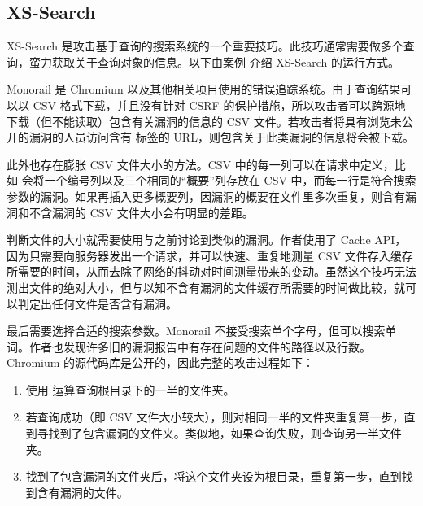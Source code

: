 \subsection{XS-Search}\label{sec:search}

XS-Search 是攻击基于查询的搜索系统的一个重要技巧。此技巧通常需要做多个查询，蛮力获取关于查询对象的信息。以下由案例 \cite{xssearch} 介绍 XS-Search 的运行方式。

Monorail 是 Chromium 以及其他相关项目使用的错误追踪系统。由于查询结果可以以 CSV 格式下载，并且没有针对 CSRF 的保护措施，所以攻击者可以跨源地下载（但不能读取）包含有关漏洞的信息的 CSV 文件。若攻击者将具有浏览未公开的漏洞的人员访问含有  标签的 URL，则包含关于此类漏洞的信息将会被下载。

此外也存在膨胀 CSV 文件大小的方法。CSV 中的每一列可以在请求中定义，比如  会将一个编号列以及三个相同的“概要”列存放在 CSV 中，而每一行是符合搜索参数的漏洞。如果再插入更多概要列，因漏洞的概要在文件里多次重复，则含有漏洞和不含漏洞的 CSV 文件大小会有明显的差距。

判断文件的大小就需要使用与之前讨论到类似的漏洞。作者使用了 Cache API，因为只需要向服务器发出一个请求，并可以快速、重复地测量 CSV 文件存入缓存所需要的时间，从而去除了网络的抖动对时间测量带来的变动。虽然这个技巧无法测出文件的绝对大小，但与以知不含有漏洞的文件缓存所需要的时间做比较，就可以判定出任何文件是否含有漏洞。

最后需要选择合适的搜索参数。Monorail 不接受搜索单个字母，但可以搜索单词。作者也发现许多旧的漏洞报告中有存在问题的文件的路径以及行数。Chromium 的源代码库是公开的，因此完整的攻击过程如下：

\begin{enumerate}
    \item 使用  运算查询根目录下的一半的文件夹。
    \item 若查询成功（即 CSV 文件大小较大），则对相同一半的文件夹重复第一步，直到寻找到了包含漏洞的文件夹。类似地，如果查询失败，则查询另一半文件夹。
    \item 找到了包含漏洞的文件夹后，将这个文件夹设为根目录，重复第一步，直到找到含有漏洞的文件。
\end{enumerate}

